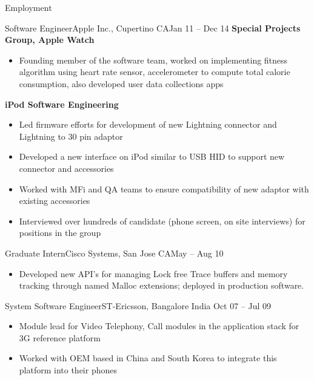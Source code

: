 \documentclass[]{mcdowellcv}
\begin{document}
\begin{cvsection}{Employment}
\begin{cvsubsection}{Software Engineer}{Apple Inc., Cupertino CA}{Jan 11 -- Dec 14}
			\textbf{Special Projects Group, Apple Watch}
			\begin{itemize}
				\item Founding member of the software team, worked on implementing fitness algorithm using heart rate sensor, accelerometer to compute total calorie consumption, also developed user data collections apps
			\end{itemize}

			\textbf{iPod Software Engineering}
			\begin{itemize}
				\item Led firmware efforts for development of new Lightning connector and Lightning to 30 pin adaptor
				\item Developed a new interface on iPod similar to USB HID to support new connector and accessories
				\item Worked with MFi and QA teams to ensure compatibility of new adaptor with existing accessories
				\item Interviewed over hundreds of candidate (phone screen, on site interviews) for positions in the group
			\end{itemize}
		\end{cvsubsection}
		
		\begin{cvsubsection}{Graduate Intern}{Cisco Systems, San Jose CA}{May -- Aug 10}
			\begin{itemize}
				\item Developed new API’s for managing Lock free Trace buffers and memory tracking through named Malloc extensions; deployed in production software.
			\end{itemize}
		\end{cvsubsection}

		\begin{cvsubsection}{System Software Engineer}{ST-Ericsson, Bangalore India }{Oct 07 -- Jul 09}
			\begin{itemize}
				\item Module lead for Video Telephony, Call modules in the application stack for 3G reference platform
				\item Worked with OEM based in China and South Korea to integrate this platform into their phones
			\end{itemize}
		\end{cvsubsection}

	\end{cvsection}
	
\end{document}

